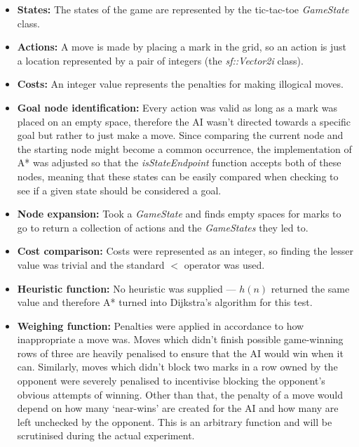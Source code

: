 \documentclass[11pt, a4paper]{report}
\begin{document}
\begin{itemize}
  \item \textbf{States:} The states of the game are represented by the tic-tac-toe \emph{GameState} class.
  \item \textbf{Actions:} A move is made by placing a mark in the grid, so an action is just a location represented by a pair of integers (the \emph{sf::Vector2i} class).
  \item \textbf{Costs:} An integer value represents the penalties for making illogical moves.
  \item \textbf{Goal node identification:} Every action was valid as long as a mark was placed on an empty space, therefore the AI wasn't directed towards a specific goal but rather to just make a move. Since comparing the current node and the starting node might become a common occurrence, the implementation of A* was adjusted so that the \emph{isStateEndpoint} function accepts both of these nodes, meaning that these states can be easily compared when checking to see if a given state should be considered a goal.
  \item \textbf{Node expansion:} Took a \emph{GameState} and finds empty spaces for marks to go to return a collection of actions and the \emph{GameStates} they led to.
  \item \textbf{Cost comparison:} Costs were represented as an integer, so finding the lesser value was trivial and the standard $<$ operator was used.
  \item \textbf{Heuristic function:} No heuristic was supplied --- $h(n)$ returned the same value and therefore A* turned into Dijkstra's algorithm for this test.
  \item \textbf{Weighing function:} Penalties were applied in accordance to how inappropriate a move was. Moves which didn't finish possible game-winning rows of three are heavily penalised to ensure that the AI would win when it can. Similarly, moves which didn't block two marks in a row owned by the opponent were severely penalised to incentivise blocking the opponent's obvious attempts of winning. Other than that, the penalty of a move would depend on how many `near-wins' are created for the AI and how many are left unchecked by the opponent. This is an arbitrary function and will be scrutinised during the actual experiment.
\end{itemize}
\end{document}
